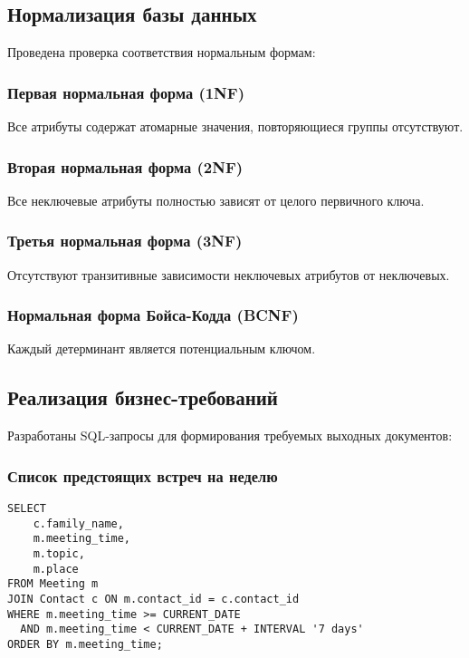 \documentclass[14pt]{extarticle}
\begin{document}
\subsection{Нормализация базы данных}

Проведена проверка соответствия нормальным формам:

\subsubsection{Первая нормальная форма (1NF)}
Все атрибуты содержат атомарные значения, повторяющиеся группы отсутствуют.

\subsubsection{Вторая нормальная форма (2NF)}
Все неключевые атрибуты полностью зависят от целого первичного ключа.

\subsubsection{Третья нормальная форма (3NF)}
Отсутствуют транзитивные зависимости неключевых атрибутов от неключевых.

\subsubsection{Нормальная форма Бойса-Кодда (BCNF)}
Каждый детерминант является потенциальным ключом.

\subsection{Реализация бизнес-требований}

Разработаны SQL-запросы для формирования требуемых выходных документов:

\subsubsection{Список предстоящих встреч на неделю}

\begin{verbatim}
SELECT
    c.family_name,
    m.meeting_time,
    m.topic,
    m.place
FROM Meeting m
JOIN Contact c ON m.contact_id = c.contact_id
WHERE m.meeting_time >= CURRENT_DATE
  AND m.meeting_time < CURRENT_DATE + INTERVAL '7 days'
ORDER BY m.meeting_time;
\end{verbatim}
\end{document}
